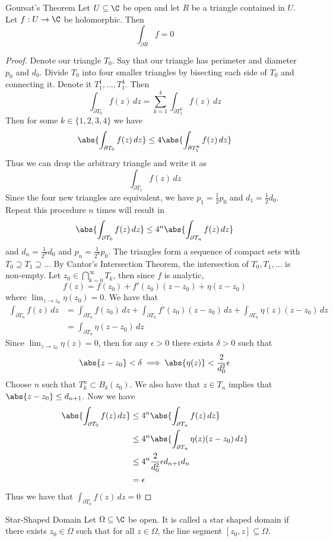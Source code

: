 \documentclass[a4paper]{article}
\begin{document}
\begin{thm}{Goursat's Theorem}{} Let $U\subseteq\C$ be open and let $R$ be a triangle contained in $U$. Let $f:U\to\C$ be holomorphic. Then $$\int_{\partial R}f=0$$ 
\begin{proof} Denote our triangle $T_0$. Say that our triangle has perimeter and diameter $p_0$ and $d_0$. Divide $T_0$ into four smaller triangles by bisecting each side of $T_0$ and connecting it. Denote it $T_1^1,\dots,T_1^4$. Then $$\int_{\partial T_0}f(z)\,dz=\sum_{k=1}^4\int_{\partial T_1^k}f(z)\,dz$$ Then for some $k\in\{1,2,3,4\}$ we have $$\abs{\int_{\partial T_0}f(z)\,dz}\leq 4\abs{\int_{\partial T_1^k}f(z)\,dz}$$ Thus we can drop the arbitrary triangle and write it as $$\int_{\partial T_1}f(z)\,dz$$ Since the four new triangles are equivalent, we have $p_1=\frac{1}{2}p_0$ and $d_1=\frac{1}{2}d_0$. Repeat this procedure $n$ times will result in $$\abs{\int_{\partial T_0}f(z)\,dz}\leq 4^n\abs{\int_{\partial T_n}f(z)\,dz}$$ and $d_n=\frac{1}{2^n}d_0$ and $p_n=\frac{1}{2^n}p_0$. The triangles form a sequence of compact sets with $T_0\supseteq T_1\supseteq\dots$ By Cantor's Intersection Theorem, the intersection of $T_0,T_1,\dots$ is non-empty. Let $z_0\in\bigcap_{k=0}^\infty T_k$, then since $f$ is analytic, $$f(z)=f(z_0)+f'(z_0)(z-z_0)+\eta(z-z_0)$$ where $\lim_{z\to z_0}\eta(z_0)=0$. We have that
\begin{align*}
\int_{\partial T_n}f(z)\,dz&=\int_{\partial T_n}f(z_0)\,dz+\int_{\partial T_n}f'(z_0)(z-z_0)\,dz+\int_{\partial T_n}\eta(z)(z-z_0)\,dz\\
&=\int_{\partial T_n}\eta(z-z_0)\,dz
\end{align*} Since $\lim_{z\to z_0}\eta(z)=0$, then for any $\epsilon>0$ there exists $\delta>0$ such that $$\abs{z-z_0}<\delta\implies\abs{\eta(z)}<\frac{2}{d_0^2}\epsilon$$ Choose $n$ such that $T_k^n\subset B_\delta(z_0)$. We also have that $z\in T_n$ implies that $\abs{z-z_0}\leq d_{n+1}$. Now we have
\begin{align*}
\abs{\int_{\partial T_0}f(z)\,dz}&\leq4^n\abs{\int_{\partial T_n}f(z)\,dz}\\
&\leq4^n\abs{\int_{\partial T_n}\eta(z)(z-z_0)\,dz}\\
&\leq4^n\frac{2}{d_0^2}\epsilon d_{n+1}d_n\\
&=\epsilon
\end{align*} Thus we have that $\int_{\partial T_0}f(z)\,dz=0$
\end{proof}
\end{thm}

\begin{defn}{Star-Shaped Domain}{} Let $\Omega\subseteq\C$ be open. It is called a star shaped domain if there exists $z_0\in\Omega$ such that for all $z\in\Omega$, the line segment $[z_0,z]\subseteq\Omega$. 
\end{defn}
\end{document}
